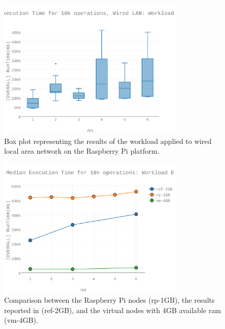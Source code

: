 \begin{figure}[h]
\includegraphics[width=3.5in]{Figures/figures-wle_fig10.pdf}

\caption{Box plot representing the results of the workload applied to wired local area network on the Raspberry Pi platform.}

\label{fig:wle_fig10}
\end{figure}

\begin{figure}[h]
\includegraphics[width=3.5in]{Figures/figures-wle_fig6.pdf}

\caption{Comparison between the Raspberry Pi nodes (rp-1GB), the results reported in \cite{Abramova2014} (ref-2GB), and the virtual nodes with 4GB available \gls{ram} (vm-4GB).}

\label{fig:fig06}
\end{figure}

